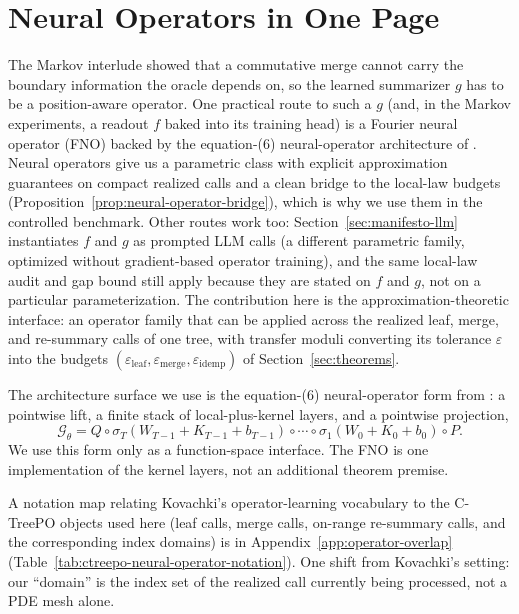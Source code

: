 \section{Neural Operators in One Page}\label{sec:fno-primer}

The Markov interlude showed that a commutative merge cannot carry the
boundary information the oracle depends on, so the learned summarizer
$g$ has to be a position-aware operator. One practical route to such a
$g$ (and, in the Markov experiments, a readout $f$ baked into its
training head) is a Fourier neural operator (FNO) backed by the
equation-(6) neural-operator architecture of
\citet{Kovachki23NeuralOperator}. Neural operators give
us a parametric class with explicit approximation guarantees on compact
realized calls and a clean bridge to the local-law budgets
(Proposition~\ref{prop:neural-operator-bridge}), which is why we use
them in the controlled benchmark. Other routes work too:
Section~\ref{sec:manifesto-llm} instantiates $f$ and $g$ as
prompted LLM calls (a different parametric family, optimized without
gradient-based operator training), and the same local-law audit and
gap bound still apply because they are stated on $f$ and $g$, not on a
particular parameterization. The contribution here is the
approximation-theoretic interface: an operator family that can be
applied across the realized leaf, merge, and re-summary calls of one
tree, with transfer moduli converting its tolerance $\varepsilon$ into
the budgets $(\varepsilon_{\mathrm{leaf}}, \varepsilon_{\mathrm{merge}},
\varepsilon_{\mathrm{idemp}})$ of Section~\ref{sec:theorems}.

The architecture surface we use is the equation-(6) neural-operator form
from \citet{Kovachki23NeuralOperator}: a pointwise lift, a finite stack
of local-plus-kernel layers, and a pointwise projection,
\begin{equation}\label{eq:equation6-no}
\mathcal{G}_{\theta}
  =
  Q \circ
  \sigma_T(W_{T-1}+K_{T-1}+b_{T-1})
  \circ \cdots \circ
  \sigma_1(W_0+K_0+b_0)
  \circ P .
\end{equation}
We use this form only as a function-space interface. The FNO is one
implementation of the kernel layers, not an additional theorem premise.

A notation map relating Kovachki's operator-learning vocabulary to the
C-TreePO objects used here (leaf calls, merge calls, on-range
re-summary calls, and the corresponding index domains) is in
Appendix~\ref{app:operator-overlap} (Table~\ref{tab:ctreepo-neural-operator-notation}).
One shift from Kovachki's setting: our ``domain'' is the index set of
the realized call currently being processed, not a PDE mesh alone.

